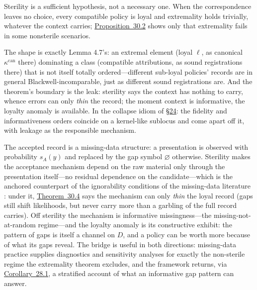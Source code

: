 Sterility is a sufficient hypothesis, not a necessary one. When the correspondence leaves no choice, every compatible policy is loyal and extremality holds trivially, whatever the context carries; \hyperlink{stmt:30.2}{Proposition~30.2} shows only that extremality fails in some nonsterile scenarios.

The shape is exactly Lemma 4.7's: an extremal element (loyal \(\ell\), as canonical \(\kappa^{\mathrm{can}}\) there) dominating a class (compatible attributions, as sound registrations there) that is not itself totally ordered---\hspace{0pt}different sub-loyal policies' records are in general Blackwell-incomparable, just as different sound registrations are. And the theorem's boundary is the leak: sterility says the context has nothing to carry, whence errors can only \emph{thin} the record; the moment context is informative, the loyalty anomaly is available. In the collapse idiom of \hyperlink{sec:24}{§24}: the fidelity and informativeness orders coincide on a kernel-like sublocus and come apart off it, with leakage as the responsible mechanism.

\begin{thmrem}

The accepted record is a missing-data structure: a presentation is observed with probability \(s_A(y)\) and replaced by the gap symbol \(\varnothing\) otherwise. Sterility makes the acceptance mechanism depend on the raw material only through the presentation itself---\hspace{0pt}no residual dependence on the candidate---\hspace{0pt}which is the anchored counterpart of the ignorability conditions of the missing-data literature \autocite{rubin1976}: under it, \hyperlink{stmt:30.4}{Theorem~30.4} says the mechanism can only \emph{thin} the loyal record (gaps still shift likelihoods, but never carry more than a garbling of the full record carries). Off sterility the mechanism is informative missingness---\hspace{0pt}the missing-not-at-random regime---\hspace{0pt}and the loyalty anomaly is its constructive exhibit: the pattern of gaps is itself a channel on \(D\), and a policy can be worth more because of what its gaps reveal. The bridge is useful in both directions: missing-data practice supplies diagnostics and sensitivity analyses for exactly the non-sterile regime the extremality theorem excludes, and the framework returns, via \hyperlink{stmt:28.1}{Corollary~28.1}, a stratified account of what an informative gap pattern can answer.
\end{thmrem}

